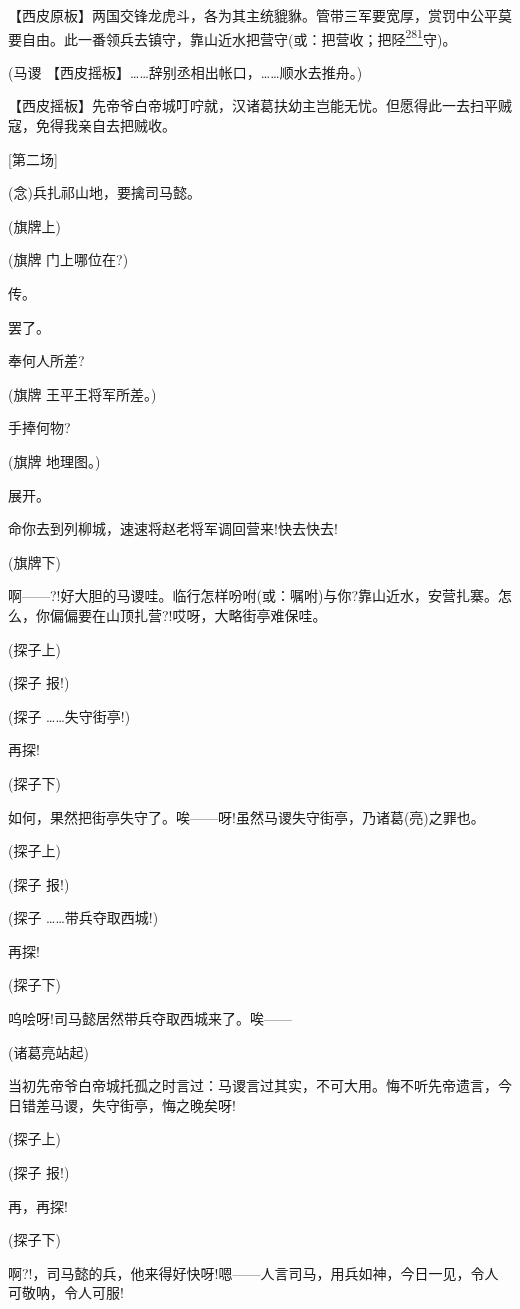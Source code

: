 【西皮原板】两国交锋龙虎斗，各为其主统貔貅。管带三军要宽厚，赏罚中公平莫要自由。此一番领兵去镇守，靠山近水把营守(或：把营收；把陉\protect\hyperlink{fn281}{\textsuperscript{281}}守)。

(马谡
【西皮摇板】\ldots{}\ldots{}辞别丞相出帐口，\ldots{}\ldots{}顺水去推舟。)

【西皮摇板】先帝爷白帝城叮咛就，汉诸葛扶幼主岂能无忧。但愿得此一去扫平贼寇，免得我亲自去把贼收。

{[}第二场{]}

(念)兵扎祁山地，要擒司马懿。

(旗牌上)

(旗牌 门上哪位在?)

传。

罢了。

奉何人所差?

(旗牌 王平王将军所差。)

手捧何物?

(旗牌 地理图。)

展开。

命你去到列柳城，速速将赵老将军调回营来!快去快去!

(旗牌下)

啊------?!好大胆的马谡哇。临行怎样吩咐(或：嘱咐)与你?靠山近水，安营扎寨。怎么，你偏偏要在山顶扎营?!哎呀，大略街亭难保哇。

(探子上)

(探子 报!)

(探子 \ldots{}\ldots{}失守街亭!)

再探!

(探子下)

如何，果然把街亭失守了。唉------呀!虽然马谡失守街亭，乃诸葛(亮)之罪也。

(探子上)

(探子 报!)

(探子 \ldots{}\ldots{}带兵夺取西城!)

再探!

(探子下)

呜哙呀!司马懿居然带兵夺取西城来了。唉------

(诸葛亮站起)

当初先帝爷白帝城托孤之时言过：马谡言过其实，不可大用。悔不听先帝遗言，今日错差马谡，失守街亭，悔之晚矣呀!

(探子上)

(探子 报!)

再，再探!

(探子下)

啊?!，司马懿的兵，他来得好快呀!嗯------人言司马，用兵如神，今日一见，令人可敬呐，令人可服!

